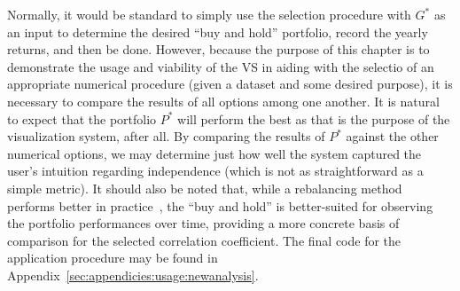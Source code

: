 Normally, it would be standard to simply use the selection procedure with $G^*$ 
as an input to determine the desired ``buy and hold'' portfolio, record the 
yearly returns, and then be done. However, because the purpose of this chapter 
is to demonstrate the usage and viability of the VS in aiding with the selectio 
of an appropriate numerical procedure (given a dataset and some desired 
purpose), it is necessary to compare the results of all options among one 
another. 
It is natural to expect that the portfolio $P^*$ will perform the best 
as that is the purpose of the visualization system, after all. 
By comparing the results of $P^*$ against the other numerical options, we may 
determine just how well the system captured the user's intuition regarding 
independence (which is not as straightforward as a simple metric).
It should also be noted that, while a rebalancing method performs better in 
practice~\cite{liuh2016}, the ``buy and hold'' is better-suited for observing 
the portfolio performances over time, providing a more concrete basis of 
comparison for the selected correlation coefficient. The final code for the 
application procedure may be found in 
Appendix~\ref{sec:appendicies:usage:newanalysis}.